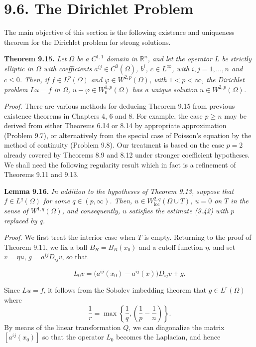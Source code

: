 \section*{9.6. The Dirichlet Problem}

The main objective of this section is the following existence and uniqueness theorem for the Dirichlet problem for strong solutions.

\textbf{Theorem 9.15.} \textit{Let $\Omega$ be a $C^{1,1}$ domain in $\mathbb{R}^n$, and let the operator $L$ be strictly elliptic in $\Omega$ with coefficients $a^{ij} \in C^0(\overline{\Omega})$, $b^i$, $c \in L^\infty$, with $i, j = 1, \ldots, n$ and $c \le 0$. Then, if $f \in L^p(\Omega)$ and $\varphi \in W^{2,p}(\Omega)$, with $1 < p < \infty$, the Dirichlet problem $Lu = f$ in $\Omega$, $u - \varphi \in W_0^{1,p}(\Omega)$ has a unique solution $u \in W^{2,p}(\Omega)$.}

\textit{Proof.} There are various methods for deducing Theorem 9.15 from previous existence theorems in Chapters 4, 6 and 8. For example, the case $p \ge n$ may be derived from either Theorems 6.14 or 8.14 by appropriate approximation (Problem 9.7), or alternatively from the special case of Poisson's equation by the method of continuity (Problem 9.8). Our treatment is based on the case $p=2$ already covered by Theorems 8.9 and 8.12 under stronger coefficient hypotheses. We shall need the following regularity result which in fact is a refinement of Theorems 9.11 and 9.13.

\textbf{Lemma 9.16.} \textit{In addition to the hypotheses of Theorem 9.13, suppose that $f \in L^q(\Omega)$ for some $q \in (p, \infty)$. Then, $u \in W^{2,q}_{\mathrm{loc}}(\Omega \cup T)$, $u = 0$ on $T$ in the sense of $W^{1,q}(\Omega)$, and consequently, $u$ satisfies the estimate (9.42) with $p$ replaced by $q$.}

\textit{Proof.} We first treat the interior case when $T$ is empty. Returning to the proof of Theorem 9.11, we fix a ball $B_R = B_R(x_0)$ and a cutoff function $\eta$, and set $v = \eta u$, $g = a^{ij}D_{ij}v$, so that

\[
L_0v = \bigl(a^{ij}(x_0) - a^{ij}(x)\bigr)D_{ij}v + g.
\]

Since $Lu = f$, it follows from the Sobolev imbedding theorem that $g \in L^r(\Omega)$ where
\[
\frac{1}{r} = \max\left\{ \frac{1}{q}, \left(\frac{1}{p} - \frac{1}{n}\right) \right\}.
\]
By means of the linear transformation $Q$, we can diagonalize the matrix $[a^{ij}(x_0)]$ so that the operator $L_0$ becomes the Laplacian, and hence

